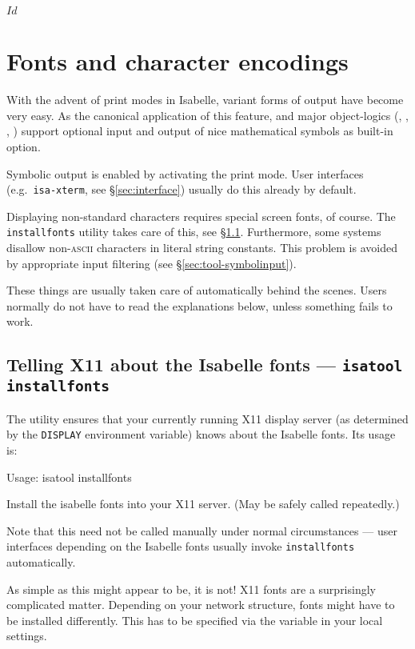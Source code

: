 
$Id$

\chapter{Fonts and character encodings}

With the advent of print modes in Isabelle, variant forms of output
have become very easy. As the canonical application of this feature,
{\Pure} and major object-logics (\FOL, \ZF, \HOL, \HOLCF) support
optional input and output of nice mathematical symbols as built-in
option.

Symbolic output is enabled by activating the  print
mode. User interfaces (e.g.\ \texttt{isa-xterm}, see
\S\ref{sec:interface}) usually do this already by default.

\medskip Displaying non-standard characters requires special screen
fonts, of course. The \texttt{installfonts} utility takes care of
this, see \S\ref{sec:tool-installfonts}. Furthermore, some {\ML}
systems disallow non-\textsc{ascii} characters in literal string
constants.  This problem is avoided by appropriate input filtering
(see \S\ref{sec:tool-symbolinput}).

These things are usually taken care of automatically behind the
scenes.  Users normally do not have to read the explanations below,
unless something fails to work.


\section{Telling X11 about the Isabelle fonts --- \texttt{isatool installfonts}}
\label{sec:tool-installfonts}

The  utility ensures that your currently running
X11 display server (as determined by the \texttt{DISPLAY} environment
variable) knows about the Isabelle fonts. Its usage is:
\begin{ttbox}
Usage: isatool installfonts

  Install the isabelle fonts into your X11 server.
  (May be safely called repeatedly.)
\end{ttbox}
Note that this need not be called manually under normal circumstances
--- user interfaces depending on the Isabelle fonts usually invoke
\texttt{installfonts} automatically.

\medskip As simple as this might appear to be, it is not! X11 fonts
are a surprisingly complicated matter. Depending on your network
structure, fonts might have to be installed differently. This has to
be specified via the  variable in your
local settings.

